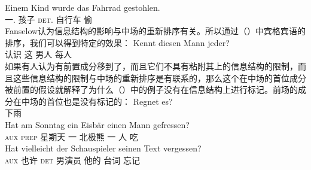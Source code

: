 \ex
\gll Einem Kind wurde das Fahrrad gestohlen.\\
     一.\dat{} 孩子 \passivepst{} \textsc{det}.\nom{} 自行车 偷\\
\zl
Fanselow认为信息结构的影响与中场的重新排序有关。所以通过（）中宾格宾语的排序，我们可以得到特定的效果：
\ea
\gll Kennt diesen Mann jeder?\\
     认识 这 男人 每人\\
\z
如果有人认为有前置成分移到了\vfc，而且它们不具有粘附其上的信息结构的限制，而且这些信息结构的限制与中场的重新排序是有联系的，那么这个在中场的首位成分被前置的假设就解释了为什么（）中的例子没有在信息结构上进行标记。前场的成分在中场的首位也是没有标记的：
\eal
\ex
\gll Regnet es?\\
     下雨 \expl\\
\ex 
\gll Hat am Sonntag ein Eisbär einen Mann gefressen?\\
     \textsc{aux} \textsc{prep} 星期天  一   北极熊 一 人 吃\\
\ex 
\gll Hat vielleicht der Schauspieler seinen Text vergessen?\\
     \textsc{aux} 也许    \textsc{det} 男演员 他的 台词 忘记\\
